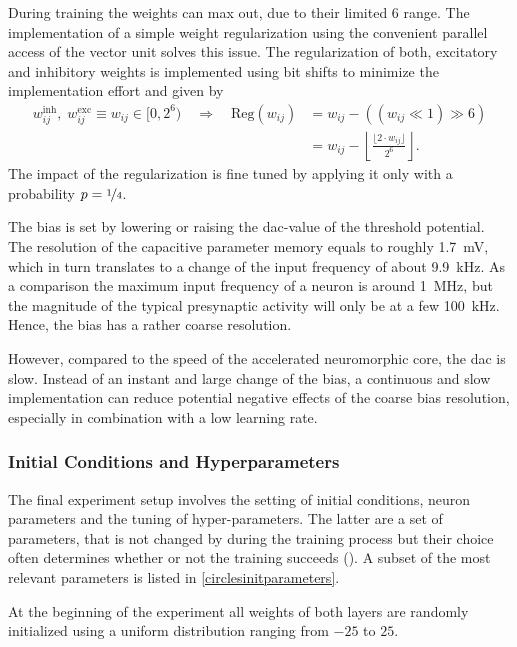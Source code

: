During training the weights can max out, due to their limited \SI{6}{\bit} range. The implementation of a simple weight regularization using the convenient parallel access of the vector unit solves this issue. The regularization of both, excitatory and inhibitory weights is implemented using bit shifts to minimize the implementation effort and given by
\begin{align*}
w_{ij}^\text{inh},\; w_{ij}^\text{exc}\equiv w_{ij} \in [0,2^6) \quad  \Rightarrow \quad \text{Reg}(w_{ij}) &= w_{ij} - \left(\left(w_{ij} \ll 1\right) \gg 6\right) \nonumber \\
&= w_{ij} - \left\lfloor \frac{\lfloor 2 \cdot w_{ij}  \rfloor}{2^{6}} \right\rfloor.					
\end{align*}
The impact of the regularization is fine tuned by applying it only with a probability $p=\nicefrac{1}{4}$.

The bias is set by lowering or raising the \gls{dac}-value of the threshold potential. The resolution of the capacitive parameter memory equals to roughly \SI{1.7}{\milli \V}, which in turn translates to a change of the input frequency of about \SI{9.9}{\kilo \Hz}. As a comparison the maximum input frequency of a neuron is around \SI{1}{\mega \Hz}, but the magnitude of the typical presynaptic activity will only be at a few \SI{100}{\kilo \Hz}. Hence, the bias has a rather coarse resolution.

However, compared to the speed of the accelerated neuromorphic core, the \acrlong{dac} is slow. Instead of an instant and large change of the bias, a continuous and slow implementation can reduce potential negative effects of the coarse bias resolution, especially in combination with a low learning rate.

\subsubsection*{Initial Conditions and Hyperparameters}

The final experiment setup involves the setting of initial conditions, neuron parameters and the tuning of hyper-parameters. The latter are a set of parameters, that is not changed by during the training process but their choice often determines whether or not the training succeeds (\citealp{Goodfellow-et-al-2016}). A subset of the most relevant parameters is listed in \cref{circlesinitparameters}.

At the beginning of the experiment all weights of both layers are randomly initialized using a uniform distribution ranging from $-25$ to $25$. 

